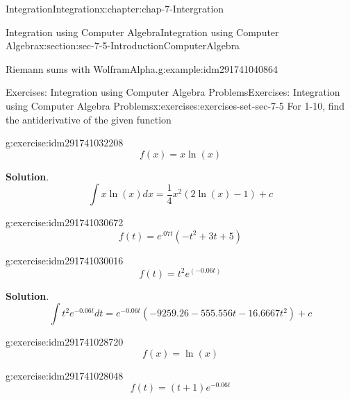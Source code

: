 \documentclass[oneside,10pt,]{book}
\numberwithin{equation}{section}
\begin{document}
\begin{chapterptx}{Integration}{}{Integration}{}{}{x:chapter:chap-7-Intergration}
\begin{sectionptx}{Integration using Computer Algebra}{}{Integration using Computer Algebra}{}{}{x:section:sec-7-5-IntroductionComputerAlgebra}
\begin{example}{Riemann sums with Wolfram\textbar{}Alpha.}{g:example:idm291741040864}
\end{example}
%
%
\typeout{************************************************}
\typeout{************************************************}
%
\begin{exercises-subsection}{Exercises: Integration using Computer Algebra Problems}{}{Exercises: Integration using Computer Algebra Problems}{}{}{x:exercises:exercises-set-sec-7-5}
For 1-10, find the antiderivative of the given function%
\begin{divisionexercise}{1}{}{}{g:exercise:idm291741032208}%
%
\begin{equation*}
f(x)=x \ln(x)
\end{equation*}
\par\smallskip%
\noindent\textbf{Solution}.\hypertarget{g:solution:idm291741031536}{}\quad{}%
\begin{equation*}
\int x \ln(x)dx=\frac{1}{4} x^{2}(2\ln(x)-1) +c
\end{equation*}
\end{divisionexercise}%
\begin{divisionexercise}{2}{}{}{g:exercise:idm291741030672}%
%
\begin{equation*}
f(t)=e^{.07t} (-t^2+3t+5)
\end{equation*}
\end{divisionexercise}%
\begin{divisionexercise}{3}{}{}{g:exercise:idm291741030016}%
%
\begin{equation*}
f(t)=t^2 e^(-0.06t)
\end{equation*}
\par\smallskip%
\noindent\textbf{Solution}.\hypertarget{g:solution:idm291741029472}{}\quad{}%
\begin{equation*}
\int t^2 e^{-0.06 t} dt= e^{-0.06t} (-9259.26 - 555.556 t - 16.6667 t^2)+c
\end{equation*}
\end{divisionexercise}%
\begin{divisionexercise}{4}{}{}{g:exercise:idm291741028720}%
%
\begin{equation*}
f(x)=\ln(x)
\end{equation*}
\end{divisionexercise}%
\begin{divisionexercise}{5}{}{}{g:exercise:idm291741028048}%
%
\begin{equation*}
f(t)=(t+1) e^{-0.06t}
\end{equation*}
\par\smallskip%

\end{divisionexercise}
\end{exercises-subsection}
\end{sectionptx}
\end{chapterptx}
\end{document}
